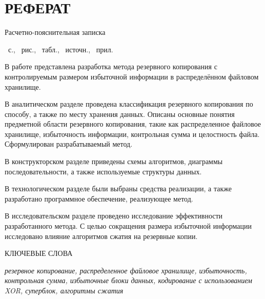 \chapter*{РЕФЕРАТ}
Расчетно-пояснительная записка \begin{NoHyper}\pageref{LastPage}\end{NoHyper}~с., \totfig~рис., \tottab~табл., \thetotbibentries~источн., ~прил.

В работе представлена разработка метода резервного копирования с контролируемым размером избыточной информации в распределённом файловом хранилище. 

В аналитическом разделе проведена классификация резервного копирования по способу, а также по месту хранения данных. Описаны основные понятия предметной области резервного копирования, такие как распределенное файловое хранилище, избыточность информации, контрольная сумма и целостность файла. Сформулирован разрабатываемый метод.

В конструкторском разделе приведены схемы алгоритмов, диаграммы последовательности, а также используемые структуры данных.

В технологическом разделе были выбраны средства реализации, а также разработано программное обеспечение, реализующее метод.

В исследовательском разделе проведено исследование эффективности разработанного метода. С целью сокращения размера избыточной информации исследовано влияние алгоритмов сжатия на резервные копии.

КЛЮЧЕВЫЕ СЛОВА

\textit{резервное копирование, распределенное файловое хранилище, избыточность, контрольная сумма, избыточные блоки данных, кодирование с использованием XOR, суперблок, алгоритмы сжатия}